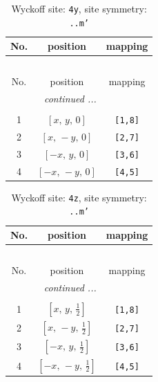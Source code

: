 \documentclass[fleqn,8pt]{jsarticle}
\begin{document}
\renewcommand{\arraystretch}{1.2}
\begin{longtable}{ccc}
\caption{Wyckoff site: {\tt 4y}, site symmetry: {\tt ..m'}}
 \\
 \hline \hline
No. & position & mapping \\ \hline \endfirsthead

\multicolumn{2}{l}{\tablename\ \thetable{}} \\
 \hline \hline
No. & position & mapping \\ \hline \endhead

 \hline \hline
\multicolumn{2}{r}{\footnotesize\it continued ...} \\ \endfoot

 \hline \hline
\multicolumn{2}{r}{} \\ \endlastfoot

1 & $\left[ x,\, y,\, 0 \right]$ & {\tt [1,8]} \\ \hline
2 & $\left[ x,\, - y,\, 0 \right]$ & {\tt [2,7]} \\ \hline
3 & $\left[ - x,\, y,\, 0 \right]$ & {\tt [3,6]} \\ \hline
4 & $\left[ - x,\, - y,\, 0 \right]$ & {\tt [4,5]} \\
\end{longtable}
\renewcommand{\arraystretch}{1.2}
\begin{longtable}{ccc}
\caption{Wyckoff site: {\tt 4z}, site symmetry: {\tt ..m'}}
 \\
 \hline \hline
No. & position & mapping \\ \hline \endfirsthead

\multicolumn{2}{l}{\tablename\ \thetable{}} \\
 \hline \hline
No. & position & mapping \\ \hline \endhead

 \hline \hline
\multicolumn{2}{r}{\footnotesize\it continued ...} \\ \endfoot

 \hline \hline
\multicolumn{2}{r}{} \\ \endlastfoot

1 & $\left[ x,\, y,\, \frac{1}{2} \right]$ & {\tt [1,8]} \\ \hline
2 & $\left[ x,\, - y,\, \frac{1}{2} \right]$ & {\tt [2,7]} \\ \hline
3 & $\left[ - x,\, y,\, \frac{1}{2} \right]$ & {\tt [3,6]} \\ \hline
4 & $\left[ - x,\, - y,\, \frac{1}{2} \right]$ & {\tt [4,5]} \\
\end{longtable}
\end{document}

